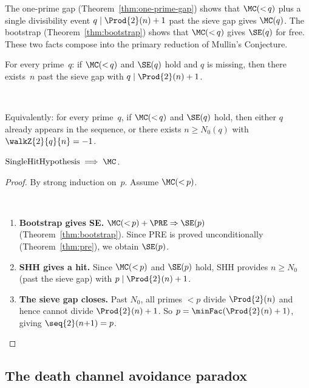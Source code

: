 The one-prime gap (Theorem~\ref{thm:one-prime-gap}) shows that
$\MC({<}\,q)$ plus a single divisibility event $q \mid \Prod{2}(n)+1$
past the sieve gap gives $\MC(q)$.  The bootstrap
(Theorem~\ref{thm:bootstrap}) shows that $\MC({<}\,q)$ gives $\SE(q)$
for free.  These two facts compose into the primary reduction of
Mullin's Conjecture.

\begin{property}\label{def:shh}
For every prime~$q$: if $\MC({<}\,q)$ and $\SE(q)$ hold and $q$ is
missing, then there exists~$n$ past the sieve gap with
$q \mid \Prod{2}(n)+1$.

\

\noindent Equivalently: for every prime~$q$, if $\MC({<}\,q)$ and $\SE(q)$
hold, then either $q$ already appears in the sequence, or there
exists $n \geq N_0(q)$ with $\walkZ{2}{q}{n} = -1$.
\end{property}

\begin{theorem}
\label{thm:single-hit}
$\mathrm{SingleHitHypothesis} \;\Longrightarrow\; \MC$.
\end{theorem}

\begin{proof}
By strong induction on~$p$.  Assume $\MC({<}\,p)$.

\

\begin{enumerate}[nosep]
\item \textbf{Bootstrap gives SE\@.}
    $\MC({<}\,p) + \PRE \Rightarrow \SE(p)$ (Theorem~\ref{thm:bootstrap}).
    Since PRE is proved unconditionally (Theorem~\ref{thm:pre}), we
    obtain $\SE(p)$.

\item \textbf{SHH gives a hit.}
    Since $\MC({<}\,p)$ and $\SE(p)$ hold, SHH provides
    $n \geq N_0$ (past the sieve gap) with $p \mid \Prod{2}(n)+1$.

\item \textbf{The sieve gap closes.}
    Past $N_0$, all primes $< p$ divide $\Prod{2}(n)$ and hence cannot
    divide $\Prod{2}(n)+1$.  So $p = \minFac(\Prod{2}(n)+1)$, giving
    $\seq{2}(n{+}1) = p$.
\end{enumerate}
\end{proof}

\subsection{The death channel avoidance paradox}

